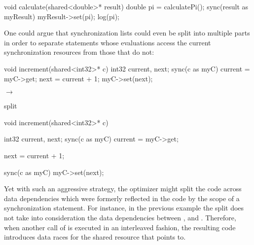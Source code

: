 \begin{ccode}
void calculate(shared<double>* result) {
  double pi = calculatePi();
  sync(result as myResult) { myResult->set(pi); }
  log(pi);
}
\end{ccode}

One could argue that synchronization lists could even be split into multiple parts in order to separate statements whose evaluations access the current synchronization resources from those that do not:

\begin{minipage}{0.35\textwidth}
\begin{ccode}
void increment(shared<int32>* c) {
  int32 current, next;
  sync(c as myC) {
    current = myC->get;
    next = current + 1;
    myC->set(next);
  }
}
\end{ccode}
\end{minipage}
\begin{minipage}{0.2\textwidth}
\begin{center}
$\longrightarrow$

split
\end{center}
\end{minipage}
\begin{minipage}{0.4\textwidth}
\begin{ccode}
void increment(shared<int32>* c) {
  int32 current, next;
  sync(c as myC) { current = myC->get; }
  
  next = current + 1;

  sync(c as myC) { myC->set(next); }
}
\end{ccode}
\end{minipage}

Yet with such an aggressive strategy, the optimizer might split the code across data dependencies which were formerly reflected in the code by the scope of a synchronization statement. For instance, in the previous example the split does not take into consideration the data dependencies between ,  and . Therefore, when another call of  is executed in an interleaved fashion, the resulting code introduces data races for the shared resource that  points to.

